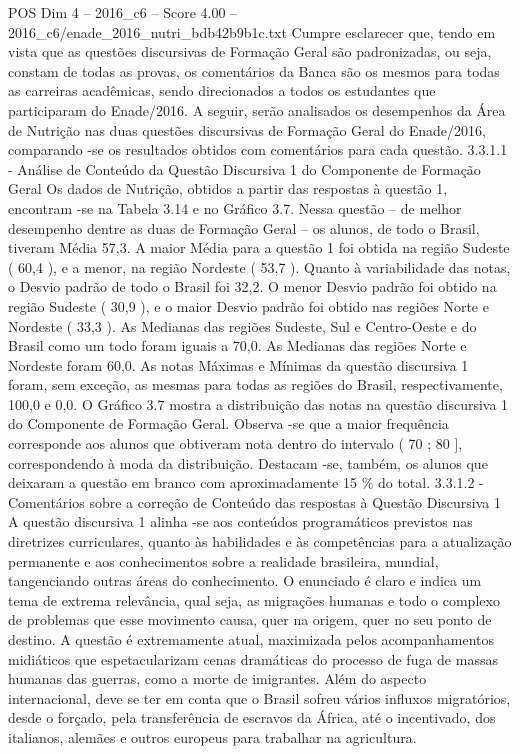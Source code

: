\begin{textsample}{POS Dim 4 – 2016\_c6 – Score 4.00 – 2016\_c6/enade\_2016\_nutri\_bdb42b9b1c.txt}
Cumpre esclarecer que, tendo em vista que as questões discursivas de Formação Geral são padronizadas, ou seja, constam de todas as provas, os comentários da Banca são os mesmos para todas as carreiras acadêmicas, sendo direcionados a todos os estudantes que participaram do Enade/2016.
A seguir, serão analisados os desempenhos da Área de Nutrição nas duas questões discursivas de Formação Geral do Enade/2016, comparando -se os resultados obtidos com comentários para cada questão. 3.3.1.1 - Análise de Conteúdo da Questão Discursiva 1 do Componente de Formação Geral Os dados de Nutrição, obtidos a partir das respostas à questão 1, encontram -se na Tabela 3.14 e no Gráfico 3.7.
Nessa questão – de melhor desempenho dentre as duas de Formação Geral – os alunos, de todo o Brasil, tiveram Média 57,3.
A maior Média para a questão 1 foi obtida na região Sudeste ( 60,4 ), e a menor, na região Nordeste ( 53,7 ).
Quanto à variabilidade das notas, o Desvio padrão de todo o Brasil foi 32,2.
O menor Desvio padrão foi obtido na região Sudeste ( 30,9 ), e o maior Desvio padrão foi obtido nas regiões Norte e Nordeste ( 33,3 ).
As Medianas das regiões Sudeste, Sul e Centro-Oeste e do Brasil como um todo foram iguais a 70,0.
As Medianas das regiões Norte e Nordeste foram 60,0.
As notas Máximas e Mínimas da questão discursiva 1 foram, sem exceção, as mesmas para todas as regiões do Brasil, respectivamente, 100,0 e 0,0.
O Gráfico 3.7 mostra a distribuição das notas na questão discursiva 1 do Componente de Formação Geral.
Observa -se que a maior frequência corresponde aos alunos que obtiveram nota dentro do intervalo ( 70 ; 80 ], correspondendo à moda da distribuição.
Destacam -se, também, os alunos que deixaram a questão em branco com aproximadamente 15 \% do total. 3.3.1.2 - Comentários sobre a correção de Conteúdo das respostas à Questão Discursiva 1 A questão discursiva 1 alinha -se aos conteúdos programáticos previstos nas diretrizes curriculares, quanto às habilidades e às competências para a atualização permanente e aos conhecimentos sobre a realidade brasileira, mundial, tangenciando outras áreas do conhecimento.
O enunciado é claro e indica um tema de extrema relevância, qual seja, as migrações humanas e todo o complexo de problemas que esse movimento causa, quer na origem, quer no seu ponto de destino.
A questão é extremamente atual, maximizada pelos acompanhamentos midiáticos que espetacularizam cenas dramáticas do processo de fuga de massas humanas das guerras, como a morte de imigrantes.
Além do aspecto internacional, deve se ter em conta que o Brasil sofreu vários influxos migratórios, desde o forçado, pela transferência de escravos da África, até o incentivado, dos italianos, alemães e outros europeus para trabalhar na agricultura.

\end{textsample}
